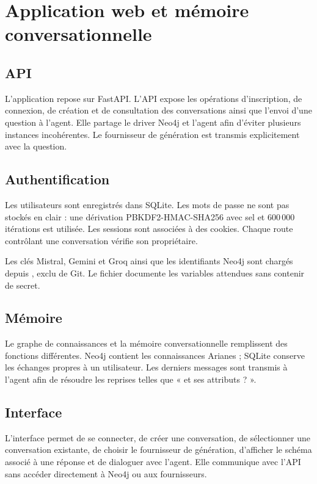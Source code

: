 \chapter{Application web et mémoire conversationnelle}

\section{API}

L'application repose sur FastAPI. L'API expose les opérations d'inscription, de connexion, de création et de consultation des conversations ainsi que l'envoi d'une question à l'agent. Elle partage le driver Neo4j et l'agent afin d'éviter plusieurs instances incohérentes. Le fournisseur de génération est transmis explicitement avec la question.

\section{Authentification}

Les utilisateurs sont enregistrés dans SQLite. Les mots de passe ne sont pas stockés en clair : une dérivation PBKDF2-HMAC-SHA256 avec sel et 600\,000 itérations est utilisée. Les sessions sont associées à des cookies. Chaque route contrôlant une conversation vérifie son propriétaire.

Les clés Mistral, Gemini et Groq ainsi que les identifiants Neo4j sont chargés depuis , exclu de Git. Le fichier  documente les variables attendues sans contenir de secret.

\section{Mémoire}

Le graphe de connaissances et la mémoire conversationnelle remplissent des fonctions différentes. Neo4j contient les connaissances Arianes ; SQLite conserve les échanges propres à un utilisateur. Les derniers messages sont transmis à l'agent afin de résoudre les reprises telles que « et ses attributs ? ».

\section{Interface}

L'interface permet de se connecter, de créer une conversation, de sélectionner une conversation existante, de choisir le fournisseur de génération, d'afficher le schéma associé à une réponse et de dialoguer avec l'agent. Elle communique avec l'API sans accéder directement à Neo4j ou aux fournisseurs.

